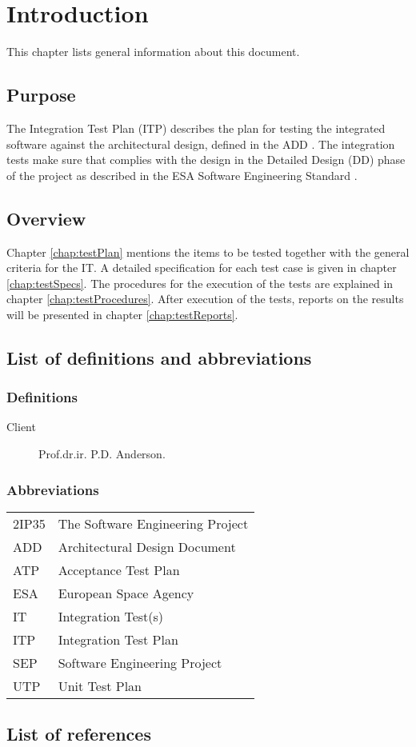\chapter{Introduction}
\label{chap:intro}
This chapter lists general information about this document.

\section{Purpose}
\label{sec:purpose}
The Integration Test Plan (ITP) describes the plan for testing the integrated software against the architectural design, defined in the ADD \cite{add}. The integration tests make sure that
\projectname{} complies with the design in the Detailed Design (DD) phase of the \projectname{} project as described in the ESA Software Engineering Standard \cite{esa}.

\section{Overview}
\label{sec:overview}
Chapter \ref{chap:testPlan} mentions the items to be tested together with the general criteria for the IT. A detailed specification for each test case is given in chapter \ref{chap:testSpecs}. The procedures for the execution of the tests are explained in chapter \ref{chap:testProcedures}. After execution of the tests, reports on the results will be presented in chapter \ref{chap:testReports}.

\section{List of definitions and abbreviations}
\label{sec:listofdef}

\subsection{Definitions}
\label{subsec:def}

\begin{description}
\item[Client] Prof.dr.ir. P.D. Anderson.
\end{description}

\subsection{Abbreviations}
\label{subsec:abbrev}
\begin{tabular}{l|l}
2IP35 & The Software Engineering Project \\
ADD & Architectural Design Document \\
ATP & Acceptance Test Plan \\
ESA & European Space Agency \\
IT & Integration Test(s) \\
ITP & Integration Test Plan \\
SEP   & Software Engineering Project \\
UTP & Unit Test Plan \\
\end{tabular}

\section{List of references}
